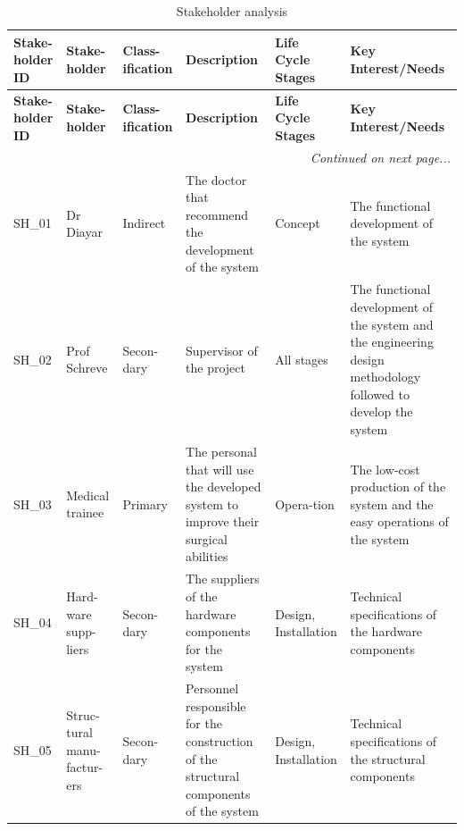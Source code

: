 \begin{longtable}{|p{}|p{}|p{}|p{}|p{}|p{}|}

    \caption{Stakeholder analysis}              %
    \label{tab:stakeholders}\\
\hline
\textbf{Stake-holder ID} & 
\textbf{Stake-holder} & 
\textbf{Class-ification} & 
\textbf{Description} & 
\textbf{Life Cycle Stages} & 
\textbf{Key Interest/Needs} \\
\hline
\endfirsthead

\hline
\textbf{Stake-holder ID} & 
\textbf{Stake-holder} & 
\textbf{Class-ification} & 
\textbf{Description} & 
\textbf{Life Cycle Stages} & 
\textbf{Key Interest/Needs} \\
\hline
\endhead

\hline
\multicolumn{6}{r|}{\textit{Continued on next page...}} \\
\hline
\endfoot

\endlastfoot

SH\_01 & 
Dr Diayar & 
Indirect & 
The doctor that recommend the development of the system & 
Concept & 
The functional development of the system \\
\hline

SH\_02 & 
Prof Schreve & 
Secon-dary & 
Supervisor of the project & 
All stages & 
The functional development of the system and the engineering 
design methodology followed to develop the system \\
\hline

SH\_03 & 
Medical trainee & 
Primary & 
The personal that will use the developed system to improve 
their surgical abilities & 
Opera-tion & 
The low-cost production of the system and the easy operations 
of the system \\
\hline

SH\_04 & 
Hard-ware supp-liers & 
Secon-dary & 
The suppliers of the hardware components for the system & 
Design, Installation & 
Technical specifications of the hardware components \\
\hline

SH\_05 & 
Struc-tural manu-factur-ers & 
Secon-dary & 
Personnel responsible for the construction of the structural 
components of the system & 
Design, Installation & 
Technical specifications of the structural components \\
\hline


\end{longtable}
